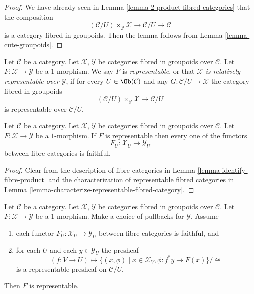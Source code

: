\begin{proof}
We have already seen in Lemma \ref{lemma-2-product-fibred-categories}
that the composition
$$
(\mathcal{C}/U) \times_\mathcal{Y} \mathcal{X}
\longrightarrow
\mathcal{C}/U
\longrightarrow
\mathcal{C}
$$
is a category fibred in groupoids. Then the lemma follows from
Lemma \ref{lemma-cute-groupoids}.
\end{proof}

\begin{definition}
\label{definition-representable-map-categories-fibred-in-groupoids}
Let $\mathcal{C}$ be a category.
Let $\mathcal{X}$, $\mathcal{Y}$ be categories fibred in groupoids
over $\mathcal{C}$.
Let $F : \mathcal{X} \to \mathcal{Y}$ be a $1$-morphism.
We say $F$ is {\it representable}, or that
{\it $\mathcal{X}$ is relatively representable over $\mathcal{Y}$},
if for every $U \in \Ob(\mathcal{C})$
and any $G : \mathcal{C}/U \to \mathcal{X}$
the category fibred in groupoids
$$
(\mathcal{C}/U) \times_\mathcal{Y} \mathcal{X}
\longrightarrow
\mathcal{C}/U
$$
is representable over $\mathcal{C}/U$.
\end{definition}

\begin{lemma}
\label{lemma-spell-out-representable-map-stack-in-groupoids}
Let $\mathcal{C}$ be a category.
Let $\mathcal{X}$, $\mathcal{Y}$ be categories fibred in groupoids
over $\mathcal{C}$.
Let $F : \mathcal{X} \to \mathcal{Y}$ be a $1$-morphism.
If $F$ is representable then every one of the functors
$$
F_U : \mathcal{X}_U \longrightarrow \mathcal{Y}_U
$$
between fibre categories is faithful.
\end{lemma}

\begin{proof}
Clear from the description of fibre categories in
Lemma \ref{lemma-identify-fibre-product} and the characterization
of representable fibred categories in
Lemma \ref{lemma-characterize-representable-fibred-category}.
\end{proof}

\begin{lemma}
\label{lemma-criterion-representable-map-stack-in-groupoids}
Let $\mathcal{C}$ be a category.
Let $\mathcal{X}$, $\mathcal{Y}$ be categories fibred in groupoids
over $\mathcal{C}$.
Let $F : \mathcal{X} \to \mathcal{Y}$ be a $1$-morphism.
Make a choice of pullbacks for $\mathcal{Y}$.
Assume
\begin{enumerate}
\item each functor $F_U : \mathcal{X}_U \longrightarrow \mathcal{Y}_U$
between fibre categories is faithful, and
\item for each $U$ and each $y \in \mathcal{Y}_U$ the presheaf
$$
(f : V \to U)
\longmapsto
\{(x, \phi) \mid x \in \mathcal{X}_V, \phi : f^*y \to F(x)\}/\cong
$$
is a representable presheaf on $\mathcal{C}/U$.
\end{enumerate}
Then $F$ is representable.
\end{lemma}

